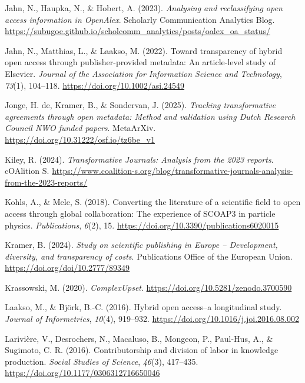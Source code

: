 \documentclass[a4paper,man,floatsintext,longtable,noextraspace,10pt]{apa6}
\newlength{\cslhangindent}
\newenvironment{CSLReferences}[2] %
{\begin{list}{}{%
  \setlength{\itemindent}{0pt}
  \setlength{\leftmargin}{0pt}
  \setlength{\parsep}{0pt}
  \ifodd #1
  \setlength{\leftmargin}{\cslhangindent}
  \setlength{\itemindent}{-1\cslhangindent}
  \fi
  \setlength{\itemsep}{#2\baselineskip}}}
{\end{list}}
\begin{document}
\begin{CSLReferences}{1}{0}
Jahn, N., Haupka, N., \& Hobert, A. (2023). \emph{Analysing and
reclassifying open access information in OpenAlex}. {Scholarly
Communication Analytics Blog}.
\url{https://subugoe.github.io/scholcomm_analytics/posts/oalex_oa_status/}

Jahn, N., Matthias, L., \& Laakso, M. (2022). Toward transparency of
hybrid open access through publisher-provided metadata: An article-level
study of {Elsevier}. \emph{Journal of the Association for Information
Science and Technology}, \emph{73}(1), 104--118.
\url{https://doi.org/10.1002/asi.24549}

Jonge, H. de, Kramer, B., \& Sondervan, J. (2025). \emph{Tracking
transformative agreements through open metadata: Method and validation
using {Dutch Research Council NWO} funded papers}. MetaArXiv.
\url{https://doi.org/10.31222/osf.io/tz6be_v1}

Kiley, R. (2024). \emph{{Transformative Journals}: Analysis from the
2023 reports}. {cOAlition S}.
\url{https://www.coalition-s.org/blog/transformative-journals-analysis-from-the-2023-reports/}

Kohls, A., \& Mele, S. (2018). Converting the literature of a scientific
field to open access through global collaboration: The experience of
SCOAP3 in particle physics. \emph{Publications}, \emph{6}(2), 15.
\url{https://doi.org/10.3390/publications6020015}

Kramer, B. (2024). \emph{Study on scientific publishing in {Europe} --
{Development}, diversity, and transparency of costs}. Publications
Office of the European Union. \url{https://doi.org/doi/10.2777/89349}

Krassowski, M. (2020). \emph{ComplexUpset}.
\url{https://doi.org/10.5281/zenodo.3700590}

Laakso, M., \& Björk, B.-C. (2016). Hybrid open access--a longitudinal
study. \emph{Journal of Informetrics}, \emph{10}(4), 919--932.
\url{https://doi.org/10.1016/j.joi.2016.08.002}

Larivière, V., Desrochers, N., Macaluso, B., Mongeon, P., Paul-Hus, A.,
\& Sugimoto, C. R. (2016). Contributorship and division of labor in
knowledge production. \emph{Social Studies of Science}, \emph{46}(3),
417--435. \url{https://doi.org/10.1177/0306312716650046}


\end{CSLReferences}
\end{document}
